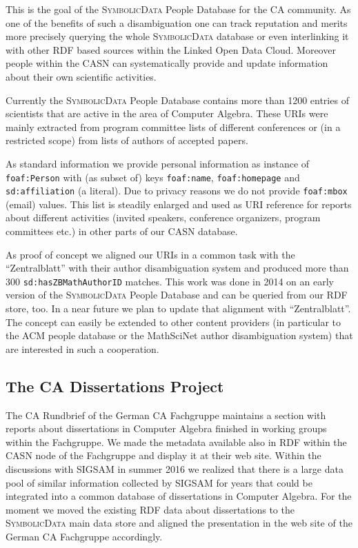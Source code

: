 \documentclass[a4paper,11pt]{article}
\def\SD{\textsc{SymbolicData}}
\begin{document}
This is the goal of the {\SD} People Database for the CA community.  As one of
the benefits of such a disambiguation one can track reputation and merits more
precisely querying the whole {\SD} database or even interlinking it with other
RDF based sources within the Linked Open Data Cloud. Moreover people within the
CASN can systematically provide and update information about their own
scientific activities.

Currently the {\SD} People Database contains more than 1200 entries of
scientists that are active in the area of Computer Algebra.  These URIs were
mainly extracted from program committee lists of different conferences or (in a
restricted scope) from lists of authors of accepted papers.

As standard information we provide personal information as instance of
\texttt{foaf:Person} with (as subset of) keys \texttt{foaf:name},
\texttt{foaf:homepage} and \texttt{sd:affiliation} (a literal). Due to privacy
reasons we do not provide \texttt{foaf:mbox} (email) values.  This list is
steadily enlarged and used as URI reference for reports about different
activities (invited speakers, conference organizers, program committees etc.)
in other parts of our CASN database.

As proof of concept we aligned our URIs in a common task with the
``Zentralblatt'' with their author disambiguation system and produced more than
300 \texttt{sd:hasZBMathAuthorID} matches. This work was done in 2014 on an
early version of the {\SD} People Database and can be queried from our RDF
store, too.  In a near future we plan to update that alignment with
``Zentralblatt''.  The concept can easily be extended to other content
providers (in particular to the ACM people database or the MathSciNet author
disambiguation system) that are interested in such a cooperation.

\subsection{The CA Dissertations Project}

The CA Rundbrief of the German CA Fachgruppe maintains a section with reports
about dissertations in Computer Algebra finished in working groups within the
Fachgruppe.  We made the metadata available also in RDF within the CASN node of
the Fachgruppe and display it at their web site.  Within the discussions with
SIGSAM in summer 2016 we realized that there is a large data pool of similar
information collected by SIGSAM for years that could be integrated into a
common database of dissertations in Computer Algebra. For the moment we moved
the existing RDF data about dissertations to the {\SD} main data store and
aligned the presentation in the web site of the German CA Fachgruppe
accordingly.
\end{document}
